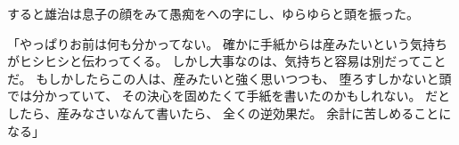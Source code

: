 \documentclass[chapter3.tex]{subfiles}
\begin{document}
\begin{CJK}{UTF8}{ipxm}
    すると雄治は息子の顔をみて愚痴をへの字にし、ゆらゆらと頭を振った。
    
    「やっぱりお前は何も分かってない。
    確かに手紙からは産みたいという気持ちがヒシヒシと伝わってくる。
    しかし大事なのは、気持ちと容易は別だってことだ。
    もしかしたらこの人は、産みたいと強く思いつつも、
    堕ろすしかないと頭では分かっていて、
    その決心を固めたくて手紙を書いたのかもしれない。
    だとしたら、産みなさいなんて書いたら、
    全くの逆効果だ。
    余計に苦しめることになる」
\end{CJK}
\end{document}
